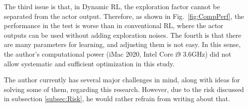 The third issue is that, in Dynamic RL, the exploration factor cannot be separated from the actor output.
Therefore, as shown in Fig.~\ref{fig:CompPerf}, the performance in the test is worse than in conventional RL,
where the actor outputs can be used without adding exploration noises.
The fourth is that there are many parameters for learning, and adjusting them is not easy.
In this sense, the author's computational power (iMac 2020, Intel Core i9 3.6GHz) did not allow systematic
and sufficient optimization in this study.

The author currently has several major challenges in mind, along with ideas for solving some of them,
regarding this research.
However, due to the risk discussed in subsection \ref{subsec:Risk},
he would rather refrain from writing about that.

